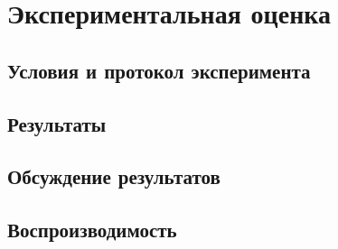 
\section{Экспериментальная оценка}
\label{sec:experiment}

\subsection{Условия и протокол эксперимента}

\subsection{Результаты}

\subsection{Обсуждение результатов}

\subsection{Воспроизводимость}

